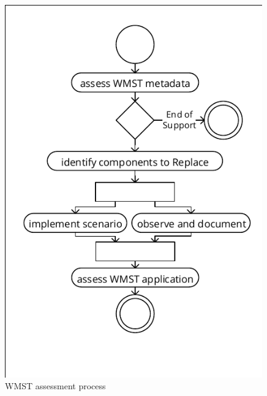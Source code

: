 \begin{figure}
\hypertarget{fig:awsm.rm.rewamp.asessment}{%
\centering
\includegraphics[width=0.99\textwidth]{../figures/rewamp/wmst-assessment.pdf}
\caption{WMST assessment process}\label{fig:awsm.rm.rewamp.asessment}
}
\end{figure}

